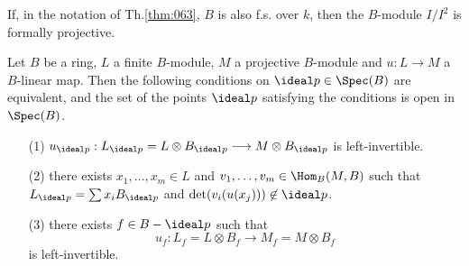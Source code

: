\documentclass[../main]{subfiles}
\begin{document}
\begin{corollary}
If, in the notation of Th.\ref{thm:063}, $B$ is also f.s. over $k$, then the $B$-module $I/I^2$ is formally projective. 
\end{corollary}

\begin{parlemma}
\label{lem:29.3}
Let $B$ be a ring, $L$ a finite $B$-module, $M$ a projective $B$-module and $u : L \longrightarrow M$ a $B$-linear map. Then the following conditions on $\ideal p \in \Spec(B)$ are equivalent, and the set of the points $\ideal p$ satisfying the conditions is open in $\Spec(B)$. 

\begin{enumerate}
    \item[(1)] $u_{\ideal p} : L_{\ideal p} = L \otimes B_{\ideal p} \longrightarrow M \otimes B_{\ideal p}$ is left-invertible.
    \item[(2)] there exists $x_1, \ldots, x_m \in L$ and $v_1, \ldots, v_m \in \Hom_B(M, B)$ such that \newline $L_{\ideal p} = \sum x_i B_{\ideal p}$ and $\det(v_i(u(x_j))) \not \in \ideal p$.
    \item[(3)] there exists $f \in B - \ideal p$ such that \[u_f : L_f = L \otimes B_f \longrightarrow M_f = M \otimes B_f\] is left-invertible. 
\end{enumerate}
\end{parlemma}
\end{document}
